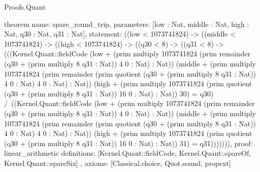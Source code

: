 \begin{lexlean}{Proofs.Quant}
\begin{semanticmodule}
theorem{
  name: spare_round_trip,
  parameters: [low : Nat, middle : Nat, high : Nat, q30 : Nat, q31 : Nat],
  statement: ((low < 1073741824) -> ((middle < 1073741824) -> ((high < 1073741824) -> ((q30 < 8) -> ((q31 < 8) -> (((Kernel.Quant::fieldCode (low + (prim multiply 1073741824 (prim remainder (q30 + (prim multiply 8 q31 : Nat)) 4 0 : Nat) : Nat)) (middle + (prim multiply 1073741824 (prim remainder (prim quotient (q30 + (prim multiply 8 q31 : Nat)) 4 0 : Nat) 4 0 : Nat) : Nat)) (high + (prim multiply 1073741824 (prim quotient (q30 + (prim multiply 8 q31 : Nat)) 16 0 : Nat) : Nat)) 30) = q30) /\ ((Kernel.Quant::fieldCode (low + (prim multiply 1073741824 (prim remainder (q30 + (prim multiply 8 q31 : Nat)) 4 0 : Nat) : Nat)) (middle + (prim multiply 1073741824 (prim remainder (prim quotient (q30 + (prim multiply 8 q31 : Nat)) 4 0 : Nat) 4 0 : Nat) : Nat)) (high + (prim multiply 1073741824 (prim quotient (q30 + (prim multiply 8 q31 : Nat)) 16 0 : Nat) : Nat)) 31) = q31))))))),
  proof: linear_arithmetic{
    definitions: [Kernel.Quant::fieldCode, Kernel.Quant::spareOf, Kernel.Quant::spareSix]
  },
  axioms: [Classical.choice, Quot.sound, propext]
}
\end{semanticmodule}
\end{lexlean}
